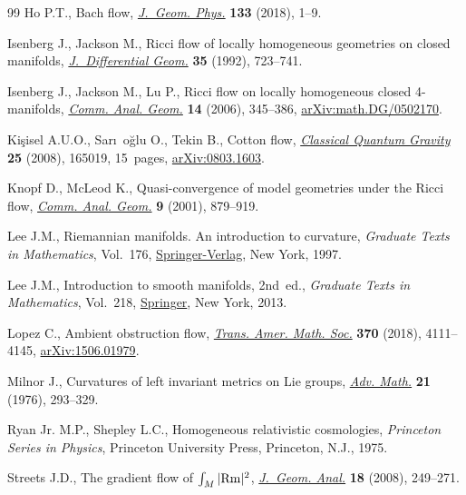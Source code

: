 \begin{thebibliography}{99}
Ho P.T., Bach flow, \href{https://doi.org/10.1016/j.geomphys.2018.07.008}{\textit{J.~Geom. Phys.}} \textbf{133} (2018), 1--9.

Isenberg J., Jackson M., Ricci flow of locally homogeneous geometries on closed
 manifolds, \href{https://doi.org/10.4310/jdg/1214448265}{\textit{J.~Differential Geom.}} \textbf{35} (1992), 723--741.

Isenberg J., Jackson M., Lu P., Ricci flow on locally homogeneous closed
 4-manifolds, \href{https://dx.doi.org/10.4310/CAG.2006.v14.n2.a5}{\textit{Comm. Anal. Geom.}} \textbf{14} (2006), 345--386, \href{https://arxiv.org/abs/math.DG/0502170}{arXiv:math.DG/0502170}.

Ki\c{s}isel A.U.O., Sar\i~o\u{g}lu O., Tekin B., Cotton flow, \href{https://doi.org/10.1088/0264-9381/25/16/165019}{\textit{Classical
 Quantum Gravity}} \textbf{25} (2008), 165019, 15~pages, \href{https://arxiv.org/abs/0803.1603}{arXiv:0803.1603}.

Knopf D., McLeod K., Quasi-convergence of model geometries under the {R}icci
 flow, \href{https://doi.org/10.4310/CAG.2001.v9.n4.a7}{\textit{Comm. Anal. Geom.}} \textbf{9} (2001), 879--919.

Lee J.M., Riemannian manifolds. An introduction to curvature, \textit{Graduate
 Texts in Mathematics}, Vol.~176, \href{https://doi.org/10.1007/b98852}{Springer-Verlag}, New York, 1997.

Lee J.M., Introduction to smooth manifolds, 2nd~ed., \textit{Graduate Texts in
 Mathematics}, Vol.~218, \href{https://doi.org/10.1007/978-1-4419-9982-5}{Springer}, New York, 2013.

Lopez C., Ambient obstruction flow, \href{https://doi.org/10.1090/tran/7106}{\textit{Trans. Amer. Math. Soc.}} \textbf{370} (2018), 4111--4145, \href{https://arxiv.org/abs/1506.01979}{arXiv:1506.01979}.

Milnor J., Curvatures of left invariant metrics on {L}ie groups, \href{https://doi.org/10.1016/S0001-8708(76)80002-3}{\textit{Adv.
 Math.}} \textbf{21} (1976), 293--329.

Ryan Jr. M.P., Shepley L.C., Homogeneous relativistic cosmologies, \textit{Princeton
 Series in Physics}, Princeton University Press, Princeton, N.J., 1975.

Streets J.D., The gradient flow of {$\int_M|{\rm Rm}|^2$}, \href{https://doi.org/10.1007/s12220-007-9000-0}{\textit{J.~Geom.
 Anal.}} \textbf{18} (2008), 249--271.

\end{thebibliography}
